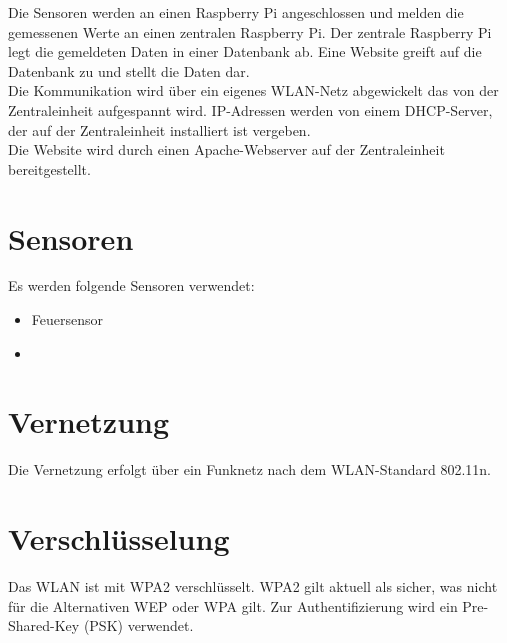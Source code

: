 Die Sensoren werden an einen Raspberry Pi angeschlossen und melden die
gemessenen Werte an einen zentralen Raspberry Pi. Der zentrale Raspberry Pi legt
die gemeldeten Daten in einer Datenbank ab. Eine Website greift auf die
Datenbank zu und stellt die Daten dar.\\
Die Kommunikation wird über ein eigenes WLAN-Netz abgewickelt das von der
Zentraleinheit aufgespannt wird. IP-Adressen werden von einem DHCP-Server, der
auf der Zentraleinheit installiert ist vergeben.\\
Die Website wird durch einen Apache-Webserver auf der Zentraleinheit
bereitgestellt.

\section{Sensoren}

Es werden folgende Sensoren verwendet:

\begin{itemize}
\item Feuersensor
\item
\end{itemize}

\section{Vernetzung}

Die Vernetzung erfolgt über ein Funknetz nach dem WLAN-Standard 802.11n. 

\section{Verschlüsselung}

Das WLAN ist mit WPA2 verschlüsselt. WPA2 gilt aktuell als sicher, was nicht für
die Alternativen WEP oder WPA gilt. Zur Authentifizierung wird ein
Pre-Shared-Key (PSK) verwendet.
